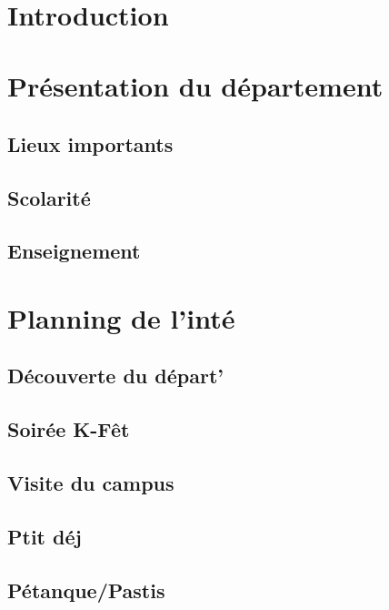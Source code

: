 

\tableofcontents
\newpage
~\\
\newpage
\begin{multicols}{2}
\section{Introduction}
    
\section{Présentation du département}
    
    \subsection{Lieux importants}
    
    \subsection{Scolarité}
    
    \subsection{Enseignement}
    
\newpage
\section{Planning de l'inté}\label{rplanning}
    
    \subsection{Découverte du départ'}
    
    \subsection{Soirée K-Fêt}
    
    \subsection{Visite du campus}
    
    \subsection{Ptit déj}
    
    \subsection{Pétanque/Pastis}
    

\end{multicols}
